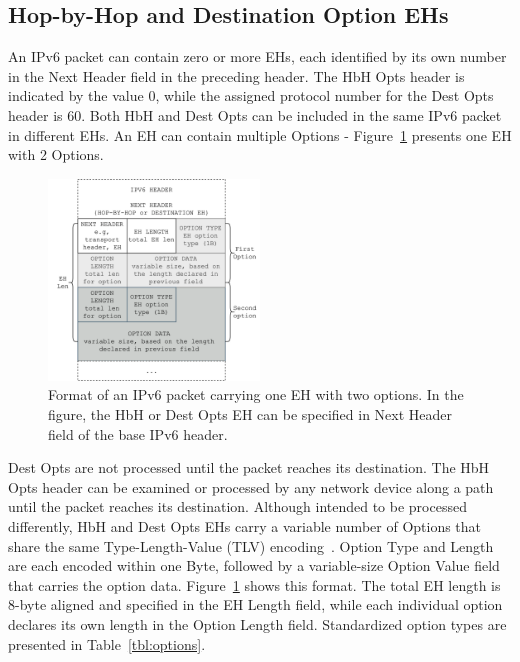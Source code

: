 \documentclass[conference]{IEEEtran}
\begin{document}

\subsection{Hop-by-Hop and Destination Option EHs}

An IPv6 packet can contain zero or more EHs, each identified by its own number in the Next Header field in the preceding header. The HbH Opts header is indicated by the value 0, while the assigned protocol number for the Dest Opts header is 60. Both HbH and Dest Opts can be included in the same IPv6 packet in different EHs. An EH can contain multiple Options - Figure~\ref{fig:eh-format} presents one EH with 2 Options.

\begin{figure}
\centering
  \includegraphics[width=0.5\textwidth]{ehformat.png}
  \caption{Format of an IPv6 packet carrying one EH with two options. In the figure, the HbH or Dest Opts EH can be specified in Next Header field of the base IPv6 header.}
  \label{fig:eh-format}
\end{figure}

Dest Opts are not processed until the packet reaches its destination. The HbH Opts header can be examined or processed by any network device along a path until the packet reaches its destination. Although intended to be processed differently, HbH and Dest Opts EHs carry a variable number of Options that share the same Type-Length-Value (TLV) encoding~\cite{RFC8200}. Option Type and Length are each encoded within one Byte, followed by a variable-size Option Value field that carries the option data. Figure~\ref{fig:eh-format} shows this format. The total EH length is 8-byte aligned and specified in the EH Length field, while each individual option declares its own length in the Option Length field. Standardized option types are presented in Table~\ref{tbl:options}.
\end{document}
